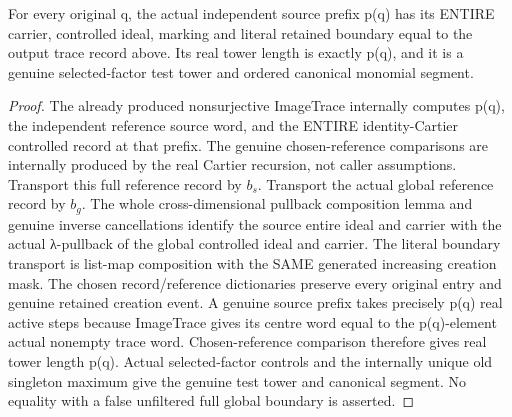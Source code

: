 \begin{theorem}
\label{hir:submersion-choice-image-trace-whole-prefix}
\leanok
{}

For every original q, the actual independent source prefix p(q) has its ENTIRE carrier, controlled ideal, marking and literal retained boundary equal to the output trace record above. Its real tower length is exactly p(q), and it is a genuine selected-factor test tower and ordered canonical monomial segment.
\end{theorem}
\begin{proof}
The already produced nonsurjective ImageTrace internally computes p(q), the independent reference source word, and the ENTIRE identity-Cartier controlled record at that prefix. The genuine chosen-reference comparisons are internally produced by the real Cartier recursion, not caller assumptions. Transport this full reference record by $b_s$. Transport the actual global reference record by $b_g$. The whole cross-dimensional pullback composition lemma and genuine inverse cancellations identify the source entire ideal and carrier with the actual λ-pullback of the global controlled ideal and carrier. The literal boundary transport is list-map composition with the SAME generated increasing creation mask. The chosen record/reference dictionaries preserve every original entry and genuine retained creation event. A genuine source prefix takes precisely p(q) real active steps because ImageTrace gives its centre word equal to the p(q)-element actual nonempty trace word. Chosen-reference comparison therefore gives real tower length p(q). Actual selected-factor controls and the internally unique old singleton maximum give the genuine test tower and canonical segment. No equality with a false unfiltered full global boundary is asserted.
\end{proof}

